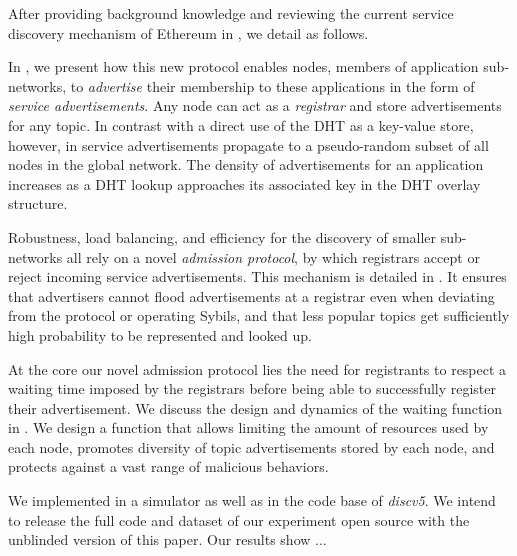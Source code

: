 After providing background knowledge and reviewing the current service discovery mechanism of Ethereum in , we detail \sysname as follows.

In , we present how this new protocol enables nodes, members of application sub-networks, to \emph{advertise} their membership to these applications in the form of \emph{service advertisements}.
Any node can act as a \emph{registrar} and store advertisements for any topic.
In contrast with a direct use of the DHT as a key-value store, however, in \sysname service advertisements propagate to a pseudo-random subset of all nodes in the global network.
The density of advertisements for an application increases as a DHT lookup approaches its associated key in the DHT overlay structure.

Robustness, load balancing, and efficiency for the discovery of smaller sub-networks all rely on a novel \emph{admission protocol}, by which registrars accept or reject incoming service advertisements.
This mechanism is detailed in .
It ensures that advertisers cannot flood advertisements at a registrar even when deviating from the protocol or operating Sybils, and that less popular topics get sufficiently high probability to be represented and looked up.  

At the core our novel admission protocol lies the need for registrants to respect a waiting time imposed by the registrars before being able to successfully register their advertisement.
We discuss the design and dynamics of the waiting function in .
We design a function that allows limiting the amount of resources used by each node, promotes diversity of topic advertisements stored by each node, and protects against a vast range of malicious behaviors.

We implemented \sysname in a simulator as well as in the code base of \emph{discv5}.
We intend to release the full code and dataset of our experiment open source with the unblinded version of this paper.
Our results show ...


